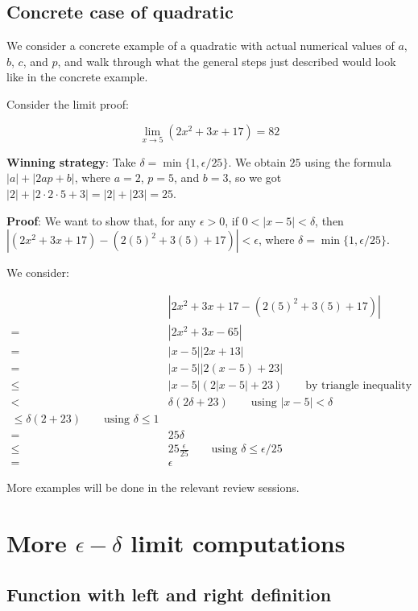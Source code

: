 \documentclass[10pt]{amsart}
\begin{document}
\subsection{Concrete case of quadratic}

We consider a concrete example of a quadratic with actual numerical
values of $a$, $b$, $c$, and $p$, and walk through what the general
steps just described would look like in the concrete example.

Consider the limit proof:

$$\lim_{x \to 5} (2x^2 + 3x + 17) = 82$$

{\bf Winning strategy}: Take $\delta = \min \{ 1, \epsilon/25 \}$. We
obtain $25$ using the formula $|a| + |2ap + b|$, where $a = 2$, $p =
5$, and $b = 3$, so we got $|2| + |2 \cdot 2 \cdot 5 + 3| = |2| + |23|
= 25$.

{\bf Proof}: We want to show that, for any $\epsilon > 0$, if $0 < |x
- 5| < \delta$, then $|(2x^2 + 3x + 17) - (2(5)^2 + 3(5) + 17)| <
\epsilon$, where $\delta = \min \{ 1, \epsilon/25 \}$.

We consider:

\begin{align*}
  & |2x^2 + 3x + 17 - (2(5)^2 + 3(5) + 17)| \\
= & |2x^2 + 3x - 65| \\
= & |x - 5||2x + 13|\\
= & |x - 5||2(x - 5) + 23| \\
\le & |x - 5|(2|x - 5| + 23) \qquad \text{by triangle inequality} \\
< & \delta(2\delta + 23) \qquad \text{using $|x - 5| < \delta$}\\
\le \delta(2 + 23) \qquad \text{using $\delta \le 1$}\\
= &25\delta \\
\le &25\frac{\epsilon}{25} \qquad \text{using $\delta \le \epsilon/25$}\\
= & \epsilon
\end{align*}

More examples will be done in the relevant review sessions.

\section{More $\epsilon-\delta$ limit computations}

\subsection{Function with left and right definition}
\end{document}

